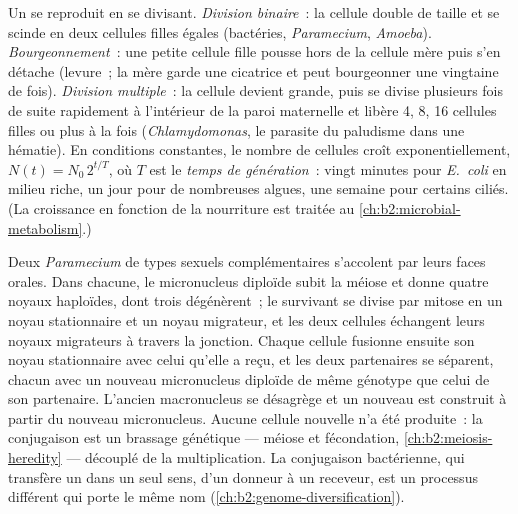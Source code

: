 \begin{definition}\label{def:b2:unicellular-diversity:division}
Un  se reproduit en se divisant. \emph{Division
binaire}~: la cellule double de taille et se scinde en deux cellules
filles égales (bactéries, \emph{Paramecium}, \emph{Amoeba}).
\emph{Bourgeonnement}~: une petite cellule fille pousse hors de la
cellule mère puis s'en détache (levure~; la mère garde une cicatrice et
peut bourgeonner une vingtaine de fois). \emph{Division multiple}~: la
cellule devient grande, puis se divise plusieurs fois de suite
rapidement à l'intérieur de la paroi maternelle et libère 4, 8, 16
cellules filles ou plus à la fois (\emph{Chlamydomonas}, le parasite du
paludisme dans une hématie). En conditions constantes, le nombre de
cellules croît exponentiellement, $N(t) = N_0\,2^{t/T}$, où $T$ est le
\emph{temps de génération}~: vingt minutes pour
\emph{E.~coli} en milieu riche, un jour pour de nombreuses algues, une
semaine pour certains ciliés. (La croissance en fonction de la
nourriture est traitée au \cref{ch:b2:microbial-metabolism}.)
\end{definition}

\begin{proposition}\label{prop:b2:unicellular-diversity:conjugation}
Deux \emph{Paramecium} de types sexuels complémentaires s'accolent par
leurs faces orales. Dans chacune, le micronucleus diploïde subit la
méiose et donne quatre noyaux haploïdes, dont trois dégénèrent~; le
survivant se divise par mitose en un noyau stationnaire et un noyau
migrateur, et les deux cellules échangent leurs noyaux migrateurs à
travers la jonction. Chaque cellule fusionne ensuite son noyau
stationnaire avec celui qu'elle a reçu, et les deux partenaires se
séparent, chacun avec un nouveau micronucleus diploïde de même génotype
que celui de son partenaire. L'ancien macronucleus se désagrège et un
nouveau est construit à partir du nouveau micronucleus. Aucune cellule
nouvelle n'a été produite~: la conjugaison est un brassage génétique ---
méiose et fécondation, \cref{ch:b2:meiosis-heredity} --- découplé de la
multiplication. La conjugaison bactérienne, qui transfère un 
dans un seul sens, d'un donneur à un receveur, est un processus
différent qui porte le même nom
(\cref{ch:b2:genome-diversification}).
\end{proposition}

